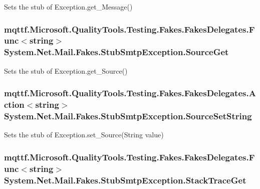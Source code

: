 Sets the stub of Exception.\-get\-\_\-\-Message()

\hypertarget{class_system_1_1_net_1_1_mail_1_1_fakes_1_1_stub_smtp_exception_a62deb86ef318a8d2d2f6d4a1db80f480}{
\subsubsection[{Source\-Get}]{\setlength{\rightskip}{0pt plus 5cm}mqttf.\-Microsoft.\-Quality\-Tools.\-Testing.\-Fakes.\-Fakes\-Delegates.\-Func$<$string$>$ System.\-Net.\-Mail.\-Fakes.\-Stub\-Smtp\-Exception.\-Source\-Get}}\label{class_system_1_1_net_1_1_mail_1_1_fakes_1_1_stub_smtp_exception_a62deb86ef318a8d2d2f6d4a1db80f480}


Sets the stub of Exception.\-get\-\_\-\-Source()

\hypertarget{class_system_1_1_net_1_1_mail_1_1_fakes_1_1_stub_smtp_exception_a2cda849cf974868b80f4db12cdcfb3ad}{
\subsubsection[{Source\-Set\-String}]{\setlength{\rightskip}{0pt plus 5cm}mqttf.\-Microsoft.\-Quality\-Tools.\-Testing.\-Fakes.\-Fakes\-Delegates.\-Action$<$string$>$ System.\-Net.\-Mail.\-Fakes.\-Stub\-Smtp\-Exception.\-Source\-Set\-String}}\label{class_system_1_1_net_1_1_mail_1_1_fakes_1_1_stub_smtp_exception_a2cda849cf974868b80f4db12cdcfb3ad}


Sets the stub of Exception.\-set\-\_\-\-Source(\-String value)

\hypertarget{class_system_1_1_net_1_1_mail_1_1_fakes_1_1_stub_smtp_exception_aa3042a202132e024ca07bd7ca91dd527}{
\subsubsection[{Stack\-Trace\-Get}]{\setlength{\rightskip}{0pt plus 5cm}mqttf.\-Microsoft.\-Quality\-Tools.\-Testing.\-Fakes.\-Fakes\-Delegates.\-Func$<$string$>$ System.\-Net.\-Mail.\-Fakes.\-Stub\-Smtp\-Exception.\-Stack\-Trace\-Get}}\label{class_system_1_1_net_1_1_mail_1_1_fakes_1_1_stub_smtp_exception_aa3042a202132e024ca07bd7ca91dd527}


